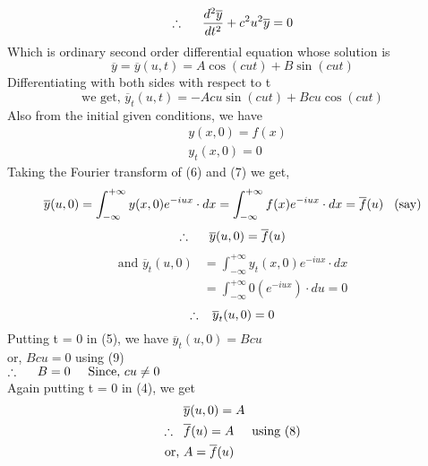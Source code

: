 \documentclass[11pt]{article}
\begin{document}
\begin{equation}
\therefore\hspace{0.5cm}\frac{d^2\overline{y}}{dt^2}+c^2u^2\overline{y}=0
\end{equation}
Which is ordinary second order differential equation whose solution is
\begin{equation}
\overline{y}=\overline{y}(u,t)=A\cos (cut) + B\sin (cut)
\end{equation}
Differentiating with both sides with respect to t
\begin{equation}
\textrm{we get, } \overline{y}_t(u,t) = -Acu\sin (cut) + Bcu \cos (cut)
\end{equation}
Also from the initial given conditions, we have
\begin{align}
&y(x,0)=f(x) \\
&y_t(x,0)=0
\end{align}
Taking the Fourier transform of (6) and (7) we get,
$$\overline{y}(u,0)=\int_{-\infty}^{+\infty}y(x,0)e^{-iux}\cdot dx=\int_{-\infty}^{+\infty}f(x)e^{-iux}\cdot dx=\overline{f}(u)\hspace{0.3cm} \textrm{(say)} $$
\begin{equation}
\therefore\hspace{0.5cm}\overline{y}(u,0)=\overline{f}(u)
\end{equation}
\begin{align*}
\textrm{and } \overline{y}_t(u,0)&=\int_{-\infty}^{+\infty}y_t(x,0)e^{-iux}\cdot dx \\
&=\int_{-\infty}^{+\infty}0(e^{-iux})\cdot du=0
\end{align*}
\begin{equation}
\therefore \hspace{0.3cm}\overline{y}_t(u,0)=0
\end{equation}
Putting t = 0 in (5), we have $\overline{y}_t(u,0)=Bcu$ \\
or, $Bcu=0$ using (9) \\
\hspace{2cm}$\therefore\hspace{0.5cm} B=0 \hspace{0.5cm} \textrm{Since, }cu \neq 0$ \\
Again putting t = 0 in (4), we get
\begin{align*}
&\overline{y}(u,0)=A \\
\therefore \hspace{0.3cm}&\overline{f}(u)=A \hspace{0.5cm} \textrm{using (8)} \\
\textrm{or, }&A=\overline{f}(u)
\end{align*}
\end{document}

